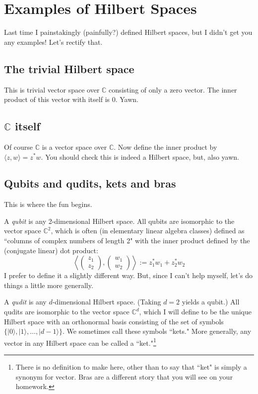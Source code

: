\documentclass{article}
\newcommand{\ket}[1]{|#1\rangle}
\newcommand{\bbC}{\mathbb{C}}
\begin{document}
\section{Examples of Hilbert Spaces}
Last time I painstakingly (painfully?) defined Hilbert spaces, but I didn't get you any examples!  Let's rectify that.

\subsection{The trivial Hilbert space}
This is trivial vector space over $\bbC$ consisting of only a zero vector.  The inner product of this vector with itself is 0.  Yawn.

\subsection{$\mathbb{C}$ itself}
Of course $\bbC$ is a vector space over $\bbC$.  Now define the inner product by $\langle z, w \rangle = z^*w$. You should check this is indeed a Hilbert space, but, also yawn.

\subsection{Qubits and qudits, kets and bras}
This is where the fun begins.

A \emph{qubit} is any 2-dimensional Hilbert space.  All qubits are isomorphic to the vector space $\bbC^2$, which is often (in elementary linear algebra classes) defined as ``columns of complex numbers of length 2" with the inner product defined by the (conjugate linear) dot product:
\[ \left\langle \begin{pmatrix} z_1 \\ z_2 \end{pmatrix} , \begin{pmatrix} w_1 \\ w_2 \end{pmatrix} \right\rangle := z_1^*w_1 + z_2^*w_2\]
I prefer to define it a slightly different way.  But, since I can't help myself, let's do things a little more generally.

A \emph{qudit} is any $d$-dimensional Hilbert space.  (Taking $d=2$ yields a qubit.)  All qudits are isomorphic to the vector space $\bbC^d$, which I will define to be the unique Hilbert space with an orthonormal basis consisting of the set of symbols $\{\ket{0},\ket{1},\dots,\ket{d-1}\}$.  We sometimes call these symbols ``kets."  More generally, any vector in any Hilbert space can be called a ``ket."\footnote{There is no definition to make here, other than to say that ``ket" is simply a synonym for vector. Bras are a different story that you will see on your homework.}
\end{document}
